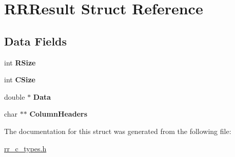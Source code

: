 \hypertarget{struct_r_r_result}{
\section{\-R\-R\-Result \-Struct \-Reference}
\label{struct_r_r_result}
}
\subsection*{\-Data \-Fields}
\begin{DoxyCompactItemize}
\item 
\hypertarget{struct_r_r_result_a4d8512c879223c0e0d1522dae38e7819}{
int {\bfseries \-R\-Size}}
\label{struct_r_r_result_a4d8512c879223c0e0d1522dae38e7819}

\item 
\hypertarget{struct_r_r_result_a17c9a5894aa9cb3789346dcaa9c370bb}{
int {\bfseries \-C\-Size}}
\label{struct_r_r_result_a17c9a5894aa9cb3789346dcaa9c370bb}

\item 
\hypertarget{struct_r_r_result_a7c5cbda3aa940f4b0d6e8a1679307dfc}{
double $\ast$ {\bfseries \-Data}}
\label{struct_r_r_result_a7c5cbda3aa940f4b0d6e8a1679307dfc}

\item 
\hypertarget{struct_r_r_result_ab339159e5604808f92fe793f4f43da03}{
char $\ast$$\ast$ {\bfseries \-Column\-Headers}}
\label{struct_r_r_result_ab339159e5604808f92fe793f4f43da03}

\end{DoxyCompactItemize}


\-The documentation for this struct was generated from the following file\-:\begin{DoxyCompactItemize}
\item 
\hyperlink{rr__c__types_8h}{rr\-\_\-c\-\_\-types.\-h}\end{DoxyCompactItemize}
